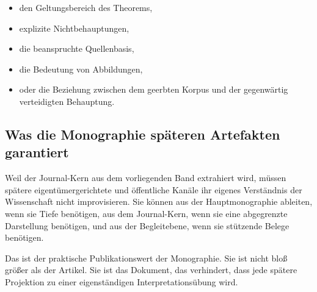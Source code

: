 \begin{itemize}
\item den Geltungsbereich des Theorems,
\item explizite Nichtbehauptungen,
\item die beanspruchte Quellenbasis,
\item die Bedeutung von Abbildungen,
\item oder die Beziehung zwischen dem geerbten Korpus und der gegenwärtig verteidigten Behauptung.
\end{itemize}

\subsection{Was die Monographie späteren Artefakten garantiert}

Weil der Journal-Kern aus dem vorliegenden Band extrahiert wird, müssen spätere eigentümergerichtete und öffentliche
Kanäle ihr eigenes Verständnis der Wissenschaft nicht improvisieren.
Sie können aus der Hauptmonographie ableiten, wenn sie Tiefe benötigen, aus dem Journal-Kern, wenn sie eine
abgegrenzte Darstellung benötigen, und aus der Begleitebene, wenn sie stützende Belege benötigen.

Das ist der praktische Publikationswert der Monographie.
Sie ist nicht bloß größer als der Artikel.
Sie ist das Dokument, das verhindert, dass jede spätere Projektion zu einer eigenständigen
Interpretationsübung wird.

\clearpage
